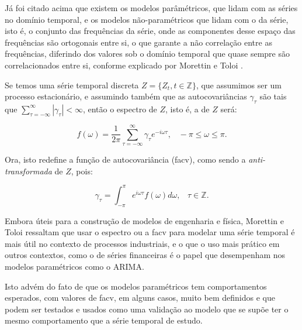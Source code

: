 Já foi citado acima que existem os modelos parâmétricos, que lidam com as séries no domínio temporal, e os modelos não-paramétricos que lidam com o  da série, isto é, o conjunto das frequências da série, onde as componentes desse espaço das frequências são ortogonais entre si, o que garante a não correlação entre as frequências, diferindo dos valores sob o domínio temporal que quase sempre são correlacionados entre si, conforme explicado por Morettin e Toloi \citep{morettin}.

Se temos uma série temporal discreta $Z = \{ Z_t, t \in \mathbb{Z} \}$, que assumimos ser um processo estacionário, e assumindo também que as autocovariâncias $\gamma_\tau$ são tais que $\sum_{\tau=-\infty}^{\infty} |\gamma_\tau| < \infty$, então o espectro de $Z$, isto é, a  de $Z$ será:

\begin{equation}\label{series:2.33}
f(\omega) = \frac{1}{2\pi} \sum_{\tau=-\infty}^{\infty} \gamma_\tau e^{-i\omega\tau}, \;\;\; -\pi\leq\omega\leq\pi.
\end{equation}

Ora, isto redefine a função de autocovariância (facv), como sendo a \emph{anti-transformada} de $Z$, pois:

\begin{equation}\label{series:2.34}
\gamma_\tau = \int_{-\pi}^{\pi} e^{i\omega\tau} f(\omega) d\omega, \;\;\; \tau \in \mathbb{Z}.
\end{equation}

Embora úteis para a construção de modelos de engenharia e física, Morettin e Toloi \citep{morettin} ressaltam que usar o espectro ou a facv para modelar uma série temporal é mais útil no contexto de processos industriais, e o que o uso mais prático em outros contextos, como o de séries financeiras é o papel que desempenham nos modelos paramétricos como o ARIMA.

Isto advém do fato de que os modelos paramétricos tem comportamentos esperados, com valores de facv, em alguns casos, muito bem definidos e que podem ser testados e usados como uma validação ao modelo que se supõe ter o mesmo comportamento que a série temporal de estudo.

